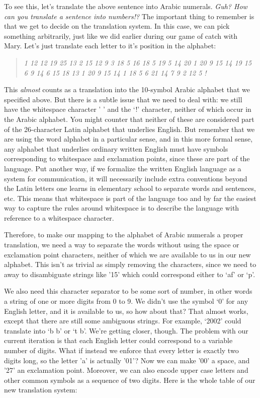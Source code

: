 \documentclass[UTF8]{book}
\begin{document}
\begin{CJK}{UTF8}{gbsn}
To see this, let's translate the above sentence into Arabic numerals. \emph{Guh? How can you translate a sentence into numbers!?} The important thing to remember is that we get to decide on the translation system. In this case, we can pick something arbitrarily, just like we did earlier during our game of catch with Mary. Let's just translate each letter to it's position in the alphabet:

\begin{quotation}
\centering
\emph{1 12 12  19 25 13 2 15 12 9 3  18 5 16 18 5 19 5 14 20 1 20 9 15 14 19  15 6  9 14 6 15 18 13 1 20 9 15 14  1 18 5  6 21 14 7 9 2 12 5 !}
\end{quotation}

This \emph{almost} counts as a translation into the 10-symbol Arabic alphabet that we specified above. But there is a subtle issue that we need to deal with: we still have the whitespace character ' ' and the `!' character, neither of which occur in the Arabic alphabet. You might counter that neither of these are considered part of the 26-character Latin alphabet that underlies English. But remember that we are using the word alphabet in a particular sense, and in this more formal sense, any alphabet that underlies ordinary written English must have symbols corresponding to whitespace and exclamation points, since these are part of the language. Put another way, if we formalize the written English language as a system for communication, it will necessarily include extra conventions beyond the Latin letters one learns in elementary school to separate words and sentences, etc. This means that whitespace is part of the language too and by far the easiest way to capture the rules around whitespace is to describe the language with reference to a whitespace character.

Therefore, to make our mapping to the alphabet of Arabic numerals a proper translation, we need a way to separate the words without using the space or exclamation point characters, neither of which we are available to us in our new alphabet. This isn't as trivial as simply removing the characters, since we need to away to disambiguate strings like '15' which could correspond either to `af' or `p'.

We also need this character separator to be some sort of number, in other words a string of one or more digits from 0 to 9. We didn't use the symbol `0' for any English letter, and it is available to us, so how about that? That almost works, except that there are still some ambiguous strings. For example, `2002' could translate into `b  b' or `t b'. We're getting closer, though. The problem with our current iteration is that each English letter could correspond to a variable number of digits. What if instead we enforce that every letter is exactly two digits long, so the letter 'a' is actually '01'? Now we can make '00' a space, and '27' an exclamation point. Moreover, we can also encode upper case letters and other common symbols as a sequence of two digits. Here is the whole table of our new translation system:


\end{CJK}
\end{document}

